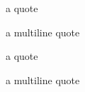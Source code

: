 \begin{Foo}
a quote

a
multiline
quote
\end{Foo}

\horizontalLine

\begin{Foo}
a quote
\end{Foo}

\horizontalLine

\begin{Foo}
a
multiline
quote
\end{Foo}
